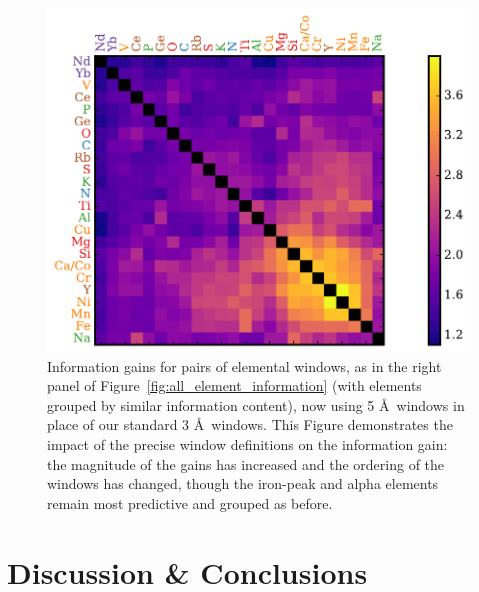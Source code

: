 \documentclass[a4paper,fleqn,usenatbib]{mnras}
\begin{document}
\begin{figure}
	\includegraphics[width=\columnwidth]{apogee_centers_final_29502_spc_iw_prior_sorted_inf_gains_abs_min_tot_dist.pdf}
    \caption{Information gains for pairs of elemental windows, as in the right panel of  Figure~\ref{fig:all_element_information} (with elements grouped by similar information content), now using 5 \AA\ windows in place of our standard 3 \AA\ windows. This Figure demonstrates the impact of the precise window definitions on the information gain: the magnitude of the gains has increased and the ordering of the windows has changed, though the iron-peak and alpha elements remain most predictive and grouped as before.}
    \label{fig:all_element_information_wide}
\end{figure}



\section{Discussion \& Conclusions}
\label{sec:discussion}
\end{document}
